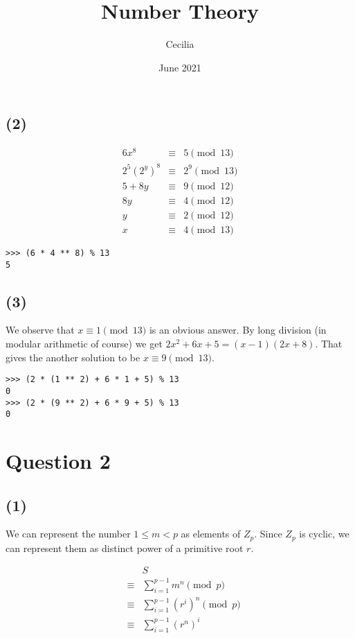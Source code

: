 \documentclass{article}
\title{Number Theory}
\author{Cecilia}
\date{June 2021}
\begin{document}


\maketitle


\subsection*{(2)}
\begin{eqnarray*}
         6x^8 & \equiv & 5   \pmod{13} \\
  2^5 (2^y)^8 & \equiv & 2^9 \pmod{13} \\
       5 + 8y & \equiv & 9   \pmod{12} \\
           8y & \equiv & 4   \pmod{12} \\
            y & \equiv & 2   \pmod{12} \\
            x & \equiv & 4   \pmod{13}
\end{eqnarray*}
\begin{verbatim}
>>> (6 * 4 ** 8) % 13
5
\end{verbatim}

\subsection*{(3)}
We observe that $ x \equiv 1 \pmod{13} $ is an obvious answer. By long division (in modular arithmetic of course) we get $ 2x^2 + 6x + 5 = (x - 1)(2x + 8) $. That gives the another solution to be $ x \equiv 9 \pmod{13} $.
\begin{verbatim}
>>> (2 * (1 ** 2) + 6 * 1 + 5) % 13
0
>>> (2 * (9 ** 2) + 6 * 9 + 5) % 13
0
\end{verbatim}

\section*{Question 2}
\subsection*{(1)}
We can represent the number $ 1 \le m < p $ as elements of $ Z_p $. Since $ Z_p $ is cyclic, we can represent them as distinct power of a primitive root $ r $.

\begin{eqnarray*}
  &      & S                                         \\
  &\equiv& \sum\limits_{i = 1}^{p-1}m^n     \pmod{p} \\
  &\equiv& \sum\limits_{i = 1}^{p-1}(r^i)^n \pmod{p} \\
  &\equiv& \sum\limits_{i = 1}^{p-1}(r^n)^i
\end{eqnarray*}
\end{document}
